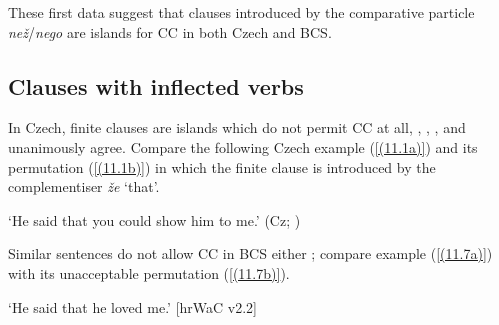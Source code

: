 \noindent These first data suggest that clauses introduced by the comparative particle \textit{než}{\slash}\textit{ne\-go} are islands for CC in both Czech and BCS.

\subsection{Clauses with inflected verbs}
\label{Clauses with inflected verbs}
In Czech, finite clauses are islands which do not permit CC at all, \citet[69]{Junghanns02}, \citet[83]{Dotlacil04}, \citet[7, 9]{Rezac05}, and \citet[103]{Rosen14} unanimously agree. Compare the following Czech example (\ref{(11.1a)}) and its permutation (\ref{(11.1b)}) in which the finite clause is introduced by the complementiser \textit{že} ‘that’.

\begin{exe}\ex
\begin{xlist}
\end{xlist}
\glt ‘He said that you could show him to me.’
\hfill (Cz; \citealt[69]{Junghanns02})
\end{exe}


\noindent Similar sentences do not allow CC in BCS either \citep[cf.][448]{CavarWilder94}; compare example (\ref{(11.7a)}) with its unacceptable permutation (\ref{(11.7b)}).


\begin{exe}\ex
\begin{xlist}
\end{xlist}
\glt ‘He said that he loved me.’
\hfill [hrWaC v2.2]
\end{exe}

